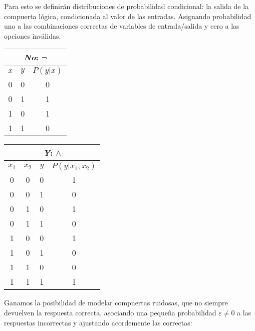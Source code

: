 Para esto se definirán distribuciones de probabilidad condicional: la salida de la compuerta lógica, condicionada al valor de las entradas.  Asignando probabilidad uno a las combinaciones correctas de variables de entrada/salida y cero a las opciones inválidas.

\begin{center}
  \begin{tabular}{cc|c} \hline
   \multicolumn{3}{c}{\emph{No}: $\lnot$} \\ \hline
   $x$ & $y$ & $P(y|x)$ \\ \hline
   0 & 0 & 0 \\
   0 & 1 & 1 \\
   1 & 0 & 1 \\
   1 & 1 & 0 \\ \hline
  \end{tabular}
  \hspace*{1cm}%
  \begin{tabular}{ccc|c} \hline
   \multicolumn{4}{c}{\emph{Y}: $\land$} \\ \hline
   $x_1$ & $x_2$ & $y$ & $P(y|x_1,x_2)$ \\ \hline
   0 & 0 & 0 & 1 \\
   0 & 0 & 1 & 0 \\
   0 & 1 & 0 & 1 \\
   0 & 1 & 1 & 0 \\
   1 & 0 & 0 & 1 \\
   1 & 0 & 1 & 0 \\
   1 & 1 & 0 & 0 \\
   1 & 1 & 1 & 1 \\ \hline
  \end{tabular}
\end{center}

Ganamos la posibilidad de modelar compuertas ruidosas, que no siempre devuelven la respuesta correcta, asociando una pequeña probabilidad $\varepsilon \neq 0$ a las respuestas incorrectas y ajustando acordemente las correctas:

